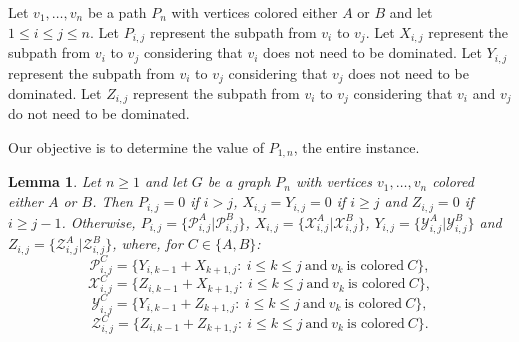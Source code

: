 \documentclass[12pt]{article}
\newtheorem{lemma}[theorem]{Lemma}
\begin{document}
Let $v_1,\ldots,v_n$ be a path $P_n$ with vertices colored either $A$ or $B$ and let $1\leq i\leq j\leq n$.
Let $P_{i,j}$ represent the subpath from $v_i$ to $v_j$.
Let $X_{i,j}$ represent the subpath from $v_i$ to $v_j$ considering that $v_i$ does not need to be dominated.
Let $Y_{i,j}$ represent the subpath from $v_i$ to $v_j$ considering that $v_j$ does not need to be dominated.
Let $Z_{i,j}$ represent the subpath from $v_i$ to $v_j$ considering that $v_i$ and $v_j$ do not need to be dominated.

Our objective is to determine the value of $P_{1,n}$, the entire instance.

\begin{lemma}\label{lem-partizan}
Let $n\geq 1$ and let $G$ be a graph $P_n$ with vertices $v_1,\ldots,v_n$ colored either $A$ or $B$. Then
$P_{i,j}=0$ if $i>j$, $X_{i,j}=Y_{i,j}=0$ if $i\geq j$ and $Z_{i,j}=0$ if $i\geq j-1$. Otherwise, 
$P_{i,j}=\{\mathcal{P}^A_{i,j}|\mathcal{P}^B_{i,j}\}$, $X_{i,j}=\{\mathcal{X}^A_{i,j}|\mathcal{X}^B_{i,j}\}$, $Y_{i,j}=\{\mathcal{Y}^A_{i,j}|\mathcal{Y}^B_{i,j}\}$ and $Z_{i,j}=\{\mathcal{Z}^A_{i,j}|\mathcal{Z}^B_{i,j}\}$, where, for $C\in\{A,B\}$:
\[
\mathcal{P}^C_{i,j}=\{Y_{i,k-1}+X_{k+1,j}:\ i\leq k\leq j\ \mbox{and}\ v_k\ \mbox{is colored}\ C\},
\]
\[
\mathcal{X}^C_{i,j}=\{Z_{i,k-1}+X_{k+1,j}:\ i\leq k\leq j\ \mbox{and}\ v_k\ \mbox{is colored}\ C\},
\]
\[
\mathcal{Y}^C_{i,j}=\{Y_{i,k-1}+Z_{k+1,j}:\ i\leq k\leq j\ \mbox{and}\ v_k\ \mbox{is colored}\ C\},
\]
\[
\mathcal{Z}^C_{i,j}=\{Z_{i,k-1}+Z_{k+1,j}:\ i\leq k\leq j\ \mbox{and}\ v_k\ \mbox{is colored}\ C\}.
\]
\end{lemma}
\end{document}
